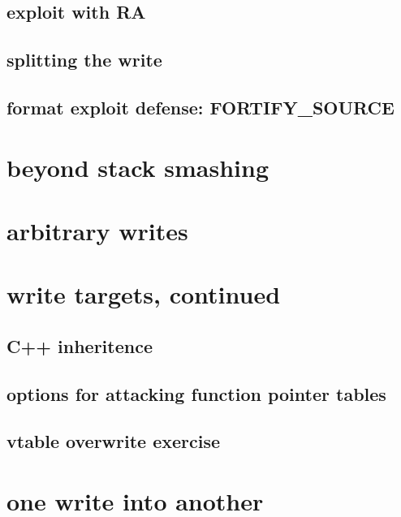 \subsection{exploit with RA}


\subsection{splitting the write}


\subsection{format exploit defense: FORTIFY\_SOURCE}


\section{beyond stack smashing}


\section{arbitrary writes}


\section{write targets, continued}

\subsection{C++ inheritence}


\subsection{options for attacking function pointer tables}


\subsection{vtable overwrite exercise}


\section{one write into another}

